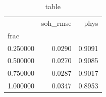 \begin{table}
\caption{table}
\label{tab:table}
\begin{tabular}{lrr}
\toprule
 & soh\_rmse & phys \\
frac &  &  \\
\midrule
0.250000 & 0.0290 & 0.9091 \\
0.500000 & 0.0270 & 0.9085 \\
0.750000 & 0.0287 & 0.9017 \\
1.000000 & 0.0347 & 0.8953 \\
\bottomrule
\end{tabular}
\end{table}

